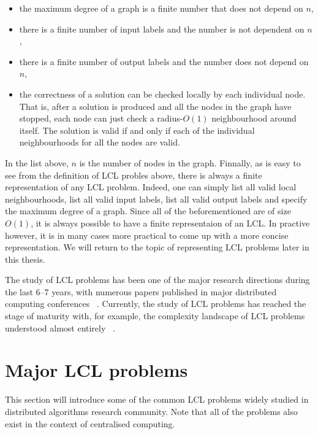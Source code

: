 \begin{itemize}

\item the maximum degree of a graph is a finite number that does not depend on $n$,

\item there is a finite number of input labels and the number is not dependent on $n$,

\item there is a finite number of output labels and the number does not depend on $n$,

\item the correctness of a solution can be checked locally by each individual node. That is,
after a solution is produced and all the nodes in the graph have stopped, each node can just
check a radius-$O(1)$ neighbourhood around itself. The solution is valid if and only if each of
the individual neighbourhoods for all the nodes are valid.

\end{itemize}
In the list above, $n$ is the number of nodes in the graph. Finnally, as is easy to see from the definition of LCL
probles
above, there is always a finite representation of any LCL problem. Indeed, one can simply list
all valid local neighbourhoods, list all valid input labels, list all valid output
labels and specify the maximum degree of a graph. Since all of the beforementioned are
of size $O(1)$, it is always possible to have a finite representaion of an LCL.
In practive however, it is in many cases more practical to come up with
a more concise representation. We will return to the topic of representing LCL
problems later in this thesis.

The study of LCL problems has been one of the major research directions
during the last 6--7 years, with numerous papers published in major
distributed computing conferences
~\cite{Balliu2016, Chang2016, Brandt2017, Chang2017, Fischer2017a, Rozhon2019, Balliu2020-1, Balliu2020-2}.
Currently, the study of LCL problems has reached the stage of maturity with,
for example, the complexity landscape of LCL problems understood
almost entirely ~\cite{Suomela2020, Chang2020a}.

\section{Major LCL problems}

This section will introduce some of the common LCL problems
widely studied in distributed algorithms research community.
Note that all of the problems also exist in the context of 
centralised computing.

